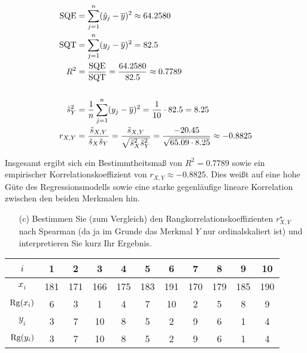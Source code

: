 {\allowdisplaybreaks
    \begin{align*}
        \operatorname{SQE} &= \sum_{j=1}^{n} (\hat{y}_j - \overline{y})^2 \approx 64.2580 \\*
        \operatorname{SQT} &= \sum_{j=1}^{n} (y_j - \overline{y})^2 = 82.5 \\*
        R^2 &= \frac{\operatorname{SQE}}{\operatorname{SQT}} = \frac{64.2580}{82.5} \approx 0.7789 \\*
        \nonumber \\
        \tilde{s}_Y^2 &= \frac1n \sum_{j=1}^{n} (y_j - \overline{y})^2 = \frac{1}{10}\cdot82.5 = 8.25 \\*
        r_{X,Y} &= \frac{\tilde{s}_{X,Y}}{\tilde{s}_X \tilde{s}_Y} = \frac{\tilde{s}_{X,Y}}{\sqrt{\tilde{s}_X^2 \tilde{s}_Y^2}}
            = \frac{-20.45}{\sqrt{65.09\cdot8.25}} \approx -0.8825
    \end{align*}
}

Insgesamt ergibt sich ein Bestimmtheitsmaß von $R^2=0.7789$ sowie ein empirischer Korrelationskoeffizient von $r_{X,Y}\approx -0.8825$. Dies weißt auf eine hohe Güte des Regressionsmodells sowie eine starke gegenläufige lineare Korrelation zwischen den beiden Merkmalen hin.

\pagebreak

\begin{task}
    \begin{enumerate}
        \item[(c)] Bestimmen Sie (zum Vergleich) den Rangkorrelationskoeffizienten $r_{X,Y}^\star$ nach Spearman (da ja im Grunde das Merkmal $Y$ nur ordinalskaliert ist) und interpretieren Sie kurz Ihr Ergebnis.
    \end{enumerate}
\end{task}

\begin{table}[H]
\centering
\begin{tabular}{c|cccccccccc}
    $i$        & 1   & 2   & 3   & 4   & 5   & 6   & 7   & 8   & 9   & 10  \\ \hline\hline

    $x_i$      & 181 & 171 & 166 & 175 & 183 & 191 & 170 & 179 & 185 & 190 \\
    $\operatorname{Rg}(x_i)$ & 6   & 3   & 1   & 4   & 7   & 10  & 2   & 5   & 8   & 9   \\ \hline\hline

    $y_i$      & 3   & 7   & 10  & 8   & 5   & 2   & 9   & 6   & 1   & 4   \\
    $\operatorname{Rg}(y_i)$ & 3   & 7   & 10  & 8   & 5   & 2   & 9   & 6   & 1   & 4
\end{tabular}
\end{table}


